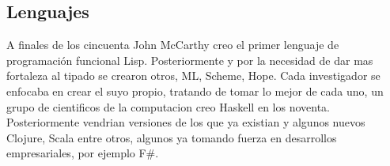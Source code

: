 \subsection{Lenguajes}

A finales de los cincuenta John McCarthy creo el primer lenguaje de programación funcional Lisp. Posteriormente y por la necesidad de dar mas fortaleza al tipado se crearon otros, ML, Scheme, Hope. Cada investigador se enfocaba en crear el suyo propio, tratando de tomar lo mejor de cada uno, un grupo de cientificos de la computacion creo Haskell en los noventa. Posteriormente vendrian versiones de los que ya existian y algunos nuevos Clojure, Scala entre otros, algunos ya tomando fuerza en desarrollos empresariales, por ejemplo F\#.

